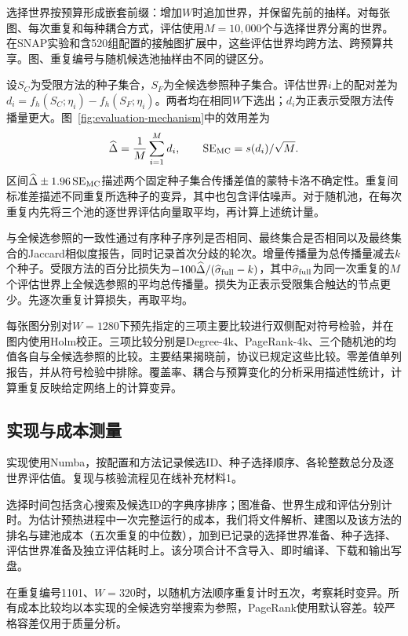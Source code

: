 \documentclass[smallextended]{svjour3}
\begin{document}
选择世界按预算形成嵌套前缀：增加$W$时追加世界，并保留先前的抽样。对每张图、每次重复和每种耦合方式，评估使用$M=10{,}000$个与选择世界分离的世界。在SNAP实验和含520组配置的接触图扩展中，这些评估世界均跨方法、跨预算共享。图、重复编号与随机候选池抽样由不同的键区分。

设$S_C$为受限方法的种子集合，$S_F$为全候选参照种子集合。评估世界$i$上的配对差为$d_i=f_h(S_C;\eta_i)-f_h(S_F;\eta_i)$。两者均在相同$W$下选出；$d_i$为正表示受限方法传播量更大。图~\ref{fig:evaluation-mechanism}中的效用差为
\begin{equation}
\widehat\Delta=\frac{1}{M}\sum_{i=1}^{M}d_i,
\qquad \operatorname{SE}_{\rm MC}=s(d_i)/\sqrt M.
\end{equation}
区间$\widehat\Delta\pm1.96\operatorname{SE}_{\rm MC}$描述两个固定种子集合传播差值的蒙特卡洛不确定性。重复间标准差描述不同重复所选种子的变异，其中也包含评估噪声。对于随机池，在每次重复内先将三个池的逐世界评估向量取平均，再计算上述统计量。

与全候选参照的一致性通过有序种子序列是否相同、最终集合是否相同以及最终集合的Jaccard相似度报告，同时记录首次分歧的轮次。增量传播量为总传播量减去$k$个种子。受限方法的百分比损失为$-100\widehat\Delta/(\widehat\sigma_{\rm full}-k)$，其中$\widehat\sigma_{\rm full}$为同一次重复的$M$个评估世界上全候选参照的平均总传播量。损失为正表示受限集合触达的节点更少。先逐次重复计算损失，再取平均。

每张图分别对$W=1280$下预先指定的三项主要比较进行双侧配对符号检验，并在图内使用Holm校正。三项比较分别是Degree-4k、PageRank-4k、三个随机池的均值各自与全候选参照的比较。主要结果揭晓前，协议已规定这些比较。零差值单列报告，并从符号检验中排除。覆盖率、耦合与预算变化的分析采用描述性统计，计算重复反映给定网络上的计算变异。

\subsection{实现与成本测量}\label{sec:cost}
实现使用Numba，按配置和方法记录候选ID、种子选择顺序、各轮整数总分及逐世界评估值。复现与核验流程见在线补充材料1。

选择时间包括贪心搜索及候选ID的字典序排序；图准备、世界生成和评估分别计时。为估计预热进程中一次完整运行的成本，我们将文件解析、建图以及该方法的排名与建池成本（五次重复的中位数），加到已记录的选择世界准备、种子选择、评估世界准备及独立评估耗时上。该分项合计不含导入、即时编译、下载和输出写盘。

在重复编号1101、$W=320$时，以随机方法顺序重复计时五次，考察耗时变异。所有成本比较均以本实现的全候选穷举搜索为参照，PageRank使用默认容差。较严格容差仅用于质量分析。
\end{document}
